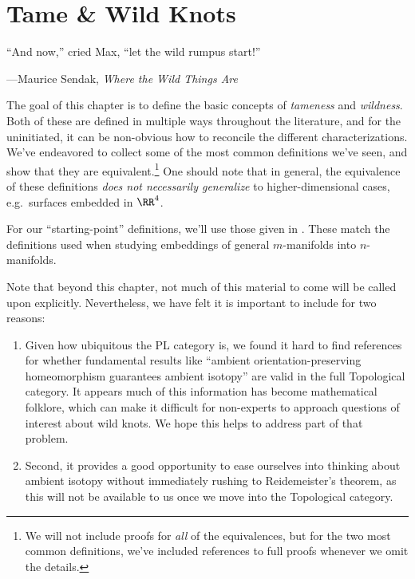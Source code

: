 \chapter{Tame \& Wild Knots}\label{chap:tame-and-wild-knots}
\def\figdir{figures/wild}
\setlength{}
\epigraph{``And now,'' cried Max, ``let the wild rumpus
  start!''}{---Maurice Sendak, \emph{Where the Wild Things Are}}


The goal of this chapter is to define the basic concepts of
\emph{tameness} and \emph{wildness}. Both of these are defined in
multiple ways throughout the literature, and for the uninitiated, it
can be non-obvious how to reconcile the different characterizations.
We've endeavored to collect some of the most common definitions we've
seen, and show that they are equivalent.\footnote{We will not include
  proofs for \emph{all} of the equivalences, but for the two most
  common definitions, we've included references to full proofs
  whenever we omit the details.} One should note that in general, the
equivalence of these definitions \emph{does not necessarily
  generalize} to higher-dimensional cases, e.g.\ surfaces embedded in
$\RR^4$.

For our ``starting-point'' definitions, we'll use those given in
\cite{Daverman}. These match the definitions used when studying
embeddings of general $m$-manifolds into $n$-manifolds.

Note that beyond this chapter, not much of this material to come will
be called upon explicitly. Nevertheless, we have felt it is important
to include for two reasons:
\begin{enumerate}
  \item Given how ubiquitous the PL category is, we found it
    hard to find references for whether fundamental results like
    ``ambient orientation-preserving homeomorphism guarantees ambient
    isotopy'' are valid in the full Topological category. It appears
    much of this information has become mathematical folklore, which
    can make it difficult for non-experts to approach questions of
    interest about wild knots. We hope this helps to address part of
    that problem.
  \item Second, it provides a good opportunity to ease ourselves into
    thinking about ambient isotopy without immediately rushing to
    Reidemeister's theorem, as this will not be available to us once
    we move into the Topological category.
\end{enumerate}


